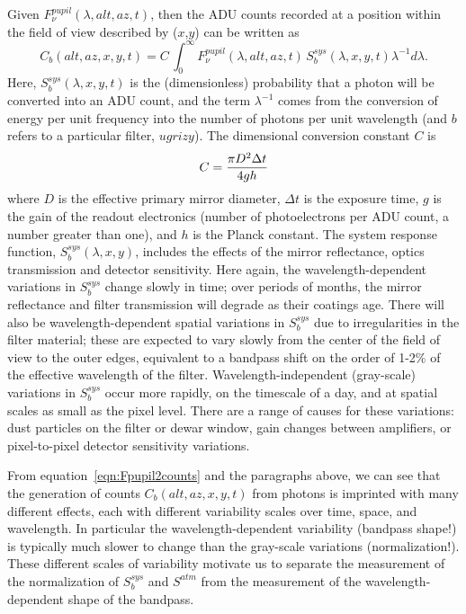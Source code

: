 \documentclass[12pt,preprint]{aastex}
\begin{document}
Given $F_\nu^{pupil}(\lambda,alt,az,t)$, then the ADU counts recorded at a
position within the field of view described by ($x$,$y$) can be
written as
\begin{equation}
\label{eqn:Fpupil2counts}
    C_b(alt,az,x,y,t) = C \, \int_0^\infty {F_\nu^{pupil}(\lambda,alt,az,t) \, S_b^{sys}(\lambda,x,y,t) \lambda^{-1}d\lambda}.
\end{equation}
Here, $S_b^{sys}(\lambda,x,y,t)$ is the (dimensionless) probability
that a photon will be converted into an ADU count, and the term
$\lambda^{-1}$ comes from the conversion of energy per unit frequency
into the number of photons per unit wavelength (and $b$ refers to a particular filter, $ugrizy$). The
dimensional conversion constant $C$ is
\begin{equation}
\label{eqn:Cconstant}
        C = {\pi D^2 \Delta t \over 4 g h }  
\end{equation}
where $D$ is the effective primary mirror diameter, $\Delta t$ is the
exposure time, $g$ is the gain of the readout electronics (number of
photoelectrons per ADU count, a number greater than one), and $h$ is
the Planck constant. The system response function,
$S_b^{sys}(\lambda,x,y)$, includes the effects of the mirror
reflectance, optics transmission and detector sensitivity. Here again, 
the wavelength-dependent variations in $S_b^{sys}$ change slowly in time; over
periods of months, the mirror reflectance and filter transmission will
degrade as their coatings age. There will also be wavelength-dependent
spatial variations in $S_b^{sys}$ due to irregularities in the filter
material; these are expected to vary slowly from the center of the
field of view to the outer edges, equivalent to a bandpass shift on
the order of 1-2\% of the effective wavelength of the
filter. Wavelength-independent (gray-scale) variations in $S_b^{sys}$ occur more
rapidly, on the timescale of a day, and at spatial scales as
small as the pixel level. There are a range of causes for these
variations: dust particles on the filter or dewar window, gain changes
between amplifiers, or pixel-to-pixel detector sensitivity variations. 

From equation~\ref{eqn:Fpupil2counts} and the paragraphs above, we can
see that the generation of counts $C_b(alt,az,x,y,t)$ from photons is
imprinted with many different effects, each with different variability
scales over time, space, and wavelength. In particular the
wavelength-dependent variability (bandpass shape!) is typically much
slower to change than the gray-scale variations
(normalization!). These different scales of variability motivate us to
separate the measurement of the normalization of $S_b^{sys}$ and
$S^{atm}$ from the measurement of the wavelength-dependent shape of
the bandpass. 
\end{document}
